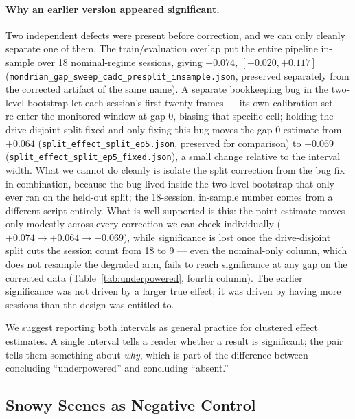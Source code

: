 \begin{sloppypar}
\paragraph{Why an earlier version appeared significant.} Two independent
defects were present before correction, and we can only cleanly separate
one of them. The train/evaluation overlap put the entire pipeline in-sample
over 18 nominal-regime sessions, giving $+0.074$, $[+0.020, +0.117]$
(\texttt{mondrian\_gap\_sweep\_cadc\_presplit\_insample.json}, preserved
separately from the corrected artifact of the same name). A
separate bookkeeping bug in the two-level bootstrap let each session's
first twenty frames --- its own calibration set --- re-enter the monitored
window at gap $0$, biasing that specific cell; holding the drive-disjoint
split fixed and only fixing this bug moves the gap-$0$ estimate from
$+0.064$ (\texttt{split\_effect\_split\_ep5.json}, preserved for
comparison) to $+0.069$ (\texttt{split\_effect\_split\_ep5\_fixed.json}), a
small change relative to the interval width. What we
cannot do cleanly is isolate the split correction from the bug fix in
combination, because the bug lived inside the two-level bootstrap that only
ever ran on the held-out split; the 18-session, in-sample number comes from
a different script entirely. What is well supported is this: the point
estimate moves only modestly across every correction we can check
individually ($+0.074 \rightarrow +0.064 \rightarrow +0.069$), while
significance is lost once the drive-disjoint split cuts the session count
from 18 to 9 --- even the nominal-only column, which does not resample the
degraded arm, fails to reach significance at any gap on the corrected data
(Table~\ref{tab:underpowered}, fourth column). The earlier significance
was not driven by a larger true effect; it was driven by having more
sessions than the design was entitled to.
\end{sloppypar}

We suggest reporting both intervals as general practice for clustered
effect estimates. A single interval tells a reader whether a result is
significant; the pair tells them something about \emph{why}, which is part
of the difference between concluding ``underpowered'' and concluding
``absent.''

\subsection{Snowy Scenes as Negative Control}
\label{sec:snowy-control}

